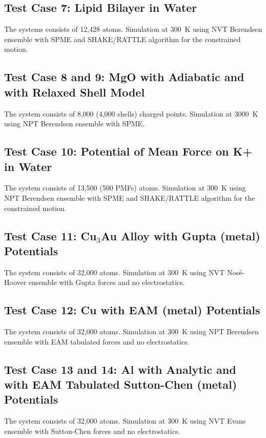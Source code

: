 \subsection{Test Case 7: Lipid Bilayer in Water}

The systems consists of 12,428 atoms.  Simulation at 300~K using NVT
Berendsen ensemble with SPME and SHAKE/RATTLE algorithm for the constrained motion.

\subsection{Test Case 8 and 9: MgO with Adiabatic and with Relaxed Shell Model}

The system consists of 8,000 (4,000 shells) charged points.  Simulation
at 3000~K using NPT Berendsen ensemble with SPME.

\subsection{Test Case 10: Potential of Mean Force on K+ in Water}

The system consists of 13,500 (500 PMFs) atoms.  Simulation at 300~K
using NPT Berendsen ensemble with SPME and SHAKE/RATTLE algorithm for
the constrained motion.

\subsection{Test Case 11: Cu$_{3}$Au Alloy with Gupta (metal) Potentials}

The system consists of 32,000 atoms.  Simulation at 300~K using NVT
Nos\'e-Hoover ensemble with Gupta forces and no electrostatics.

\subsection{Test Case 12: Cu with EAM (metal) Potentials}

The system consists of 32,000 atoms.  Simulation at 300~K using NPT
Berendsen ensemble with EAM tabulated forces and no electrostatics.

\subsection{Test Case 13 and 14: Al with Analytic and with EAM Tabulated Sutton-Chen (metal) Potentials}

The system consists of 32,000 atoms.  Simulation at 300~K using NVT
Evans ensemble with Sutton-Chen forces and no electrostatics.

